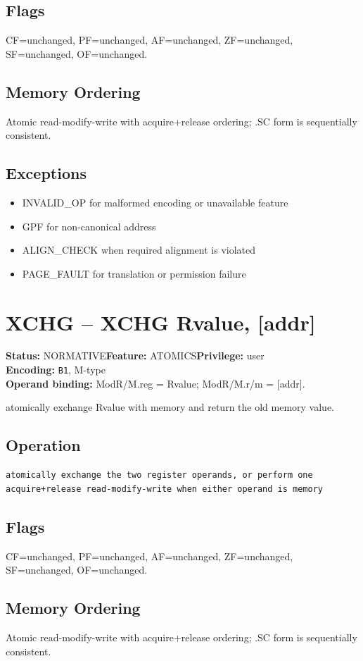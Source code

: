 \documentclass[10pt]{article}
\begin{document}
\subsection*{Flags}
CF=unchanged, PF=unchanged, AF=unchanged, ZF=unchanged, SF=unchanged, OF=unchanged.
\subsection*{Memory Ordering}
Atomic read-modify-write with acquire+release ordering; .SC form is sequentially consistent.
\subsection*{Exceptions}
\begin{itemize}
\item INVALID\_OP for malformed encoding or unavailable feature
\item GPF for non-canonical address
\item ALIGN\_CHECK when required alignment is violated
\item PAGE\_FAULT for translation or permission failure
\end{itemize}
\clearpage

\section{XCHG -- XCHG Rvalue, [addr]}
\textbf{Status:} NORMATIVE\quad \textbf{Feature:} ATOMICS\quad \textbf{Privilege:} user\\
\textbf{Encoding:} \texttt{B1}, M-type\\
\textbf{Operand binding:} ModR/M.reg = Rvalue; ModR/M.r/m = [addr].

atomically exchange Rvalue with memory and return the old memory value.

\subsection*{Operation}
\begin{lstlisting}
atomically exchange the two register operands, or perform one acquire+release read-modify-write when either operand is memory
\end{lstlisting}
\subsection*{Flags}
CF=unchanged, PF=unchanged, AF=unchanged, ZF=unchanged, SF=unchanged, OF=unchanged.
\subsection*{Memory Ordering}
Atomic read-modify-write with acquire+release ordering; .SC form is sequentially consistent.
\end{document}
